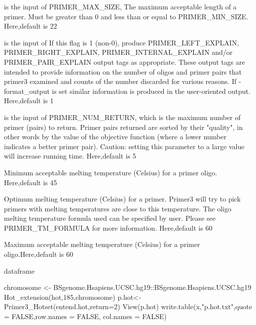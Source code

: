 \documentclass[a4paper]{book}
\begin{document}
\begin{Arguments}
\begin{ldescription}
\item[\code{max\_size}] is the input of PRIMER\_MAX\_SIZE, The maximum acceptable length of a primer.
Must be greater than 0 and less than or equal to PRIMER\_MIN\_SIZE. Here,default is 22

\item[\code{explain\_fiag}] is the input of If this flag is 1 (non-0), produce PRIMER\_LEFT\_EXPLAIN,
PRIMER\_RIGHT\_EXPLAIN, PRIMER\_INTERNAL\_EXPLAIN and/or PRIMER\_PAIR\_EXPLAIN output tags
as appropriate. These output tags are intended to provide information on the number
of oligos and primer pairs that primer3 examined and counts of the number discarded
for various reasons. If -format\_output is set similar information is produced in the
user-oriented output. Here,default is 1

\item[\code{return}] is the input of PRIMER\_NUM\_RETURN, which is the maximum number of primer (pairs) to return. Primer pairs
returned are sorted by their "quality", in other words by the value of the objective function
(where a lower number indicates a better primer pair). Caution: setting this parameter to a
large value will increase running time. Here,default is 5

\item[\code{min\_tm}] Minimum acceptable melting temperature (Celsius) for a primer oligo. Here,default is 45

\item[\code{opt\_tm}] Optimum melting temperature (Celsius) for a primer. Primer3 will try
to pick primers with melting temperatures are close to this temperature. The oligo
melting temperature formula used can be specified by user. Please see PRIMER\_TM\_FORMULA
for more information. Here,default is 60

\item[\code{max\_tm}] Maximum acceptable melting temperature (Celsius) for a primer oligo.Here,default is 60
\end{ldescription}
\end{Arguments}
%
\begin{Value}
dataframe
\end{Value}
%
\begin{Examples}
\begin{ExampleCode}
chromosome <- BSgenome.Hsapiens.UCSC.hg19::BSgenome.Hsapiens.UCSC.hg19
Hot_extension(hot,185,chromosome)
p.hot<-Primer3_Hotset(entend.hot,return=2)
View(p.hot)
write.table(x,"p.hot.txt",quote = FALSE,row.names = FALSE, col.names = FALSE)
\end{ExampleCode}
\end{Examples}
\end{document}
